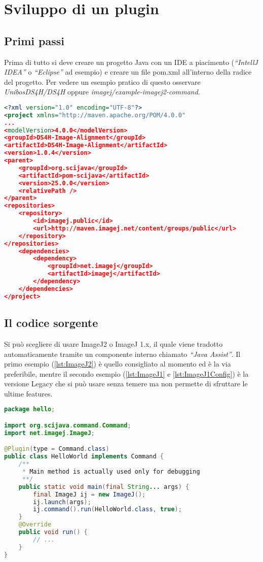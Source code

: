 \section{Sviluppo di un plugin}

\subsection{Primi passi}
\noindent Prima di tutto si deve creare un progetto Java con un IDE a piacimento (\textit{``IntellJ IDEA''} o \textit{``Eclipse''} ad esempio) e creare un file pom.xml all'interno della radice del progetto. Per vedere un esempio pratico di questo osservare \textit{UnibosDS4H/DS4H} oppure \textit{imagej/example-imagej2-command}.

\begin{lstlisting}[language=XML,caption={Esempio parziale di file pom.xml UnibosDS4H/DS4H su Github}, label={lst:pom}]
<?xml version="1.0" encoding="UTF-8"?>
<project xmlns="http://maven.apache.org/POM/4.0.0"
...
<modelVersion>4.0.0</modelVersion>
<groupId>DS4H-Image-Alignment</groupId>
<artifactId>DS4H-Image-Alignment</artifactId>
<version>1.0.4</version>
<parent>
    <groupId>org.scijava</groupId>
    <artifactId>pom-scijava</artifactId>
    <version>25.0.0</version>
    <relativePath />
</parent>
<repositories>
    <repository>
        <id>imagej.public</id>
        <url>http://maven.imagej.net/content/groups/public</url>
    </repository>
</repositories>
    <dependencies>
        <dependency>
            <groupId>net.imagej</groupId>
            <artifactId>imagej</artifactId>
        </dependency>
    </dependencies>
</project>
\end{lstlisting}

\subsection{Il codice sorgente}
\noindent Si può scegliere di usare ImageJ2 o ImageJ 1.x, il quale viene tradotto automaticamente tramite un componente interno chiamato \textit{``Java Assist''}. Il primo esempio (\ref{lst:ImageJ2}) è quello consigliato al momento ed è la via preferibile, mentre il secondo esempio (\ref{lst:ImageJ1} e \ref{lst:ImageJ1Config}) è la versione Legacy che si può usare senza temere ma non permette di sfruttare le ultime features.

\begin{lstlisting}[language=Java,caption={Esempio semplice di un plugin Fiji in cui si fa uso di ImageJ2},label={lst:ImageJ2}]
package hello;

import org.scijava.command.Command;
import net.imagej.ImageJ;

@Plugin(type = Command.class)
public class HelloWorld implements Command {
	/**
	 * Main method is actually used only for debugging
	 **/
    public static void main(final String... args) {
        final ImageJ ij = new ImageJ();
        ij.launch(args);
        ij.command().run(HelloWorld.class, true);
    }
    @Override
    public void run() {
    	// ...
    }
}
\end{lstlisting}


